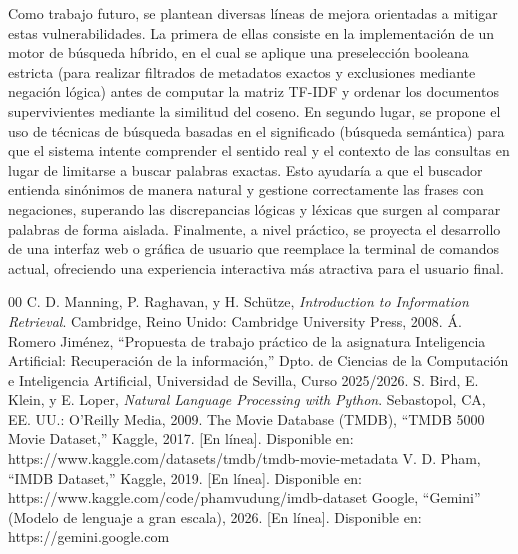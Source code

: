 \documentclass[conference,a4paper]{IEEEtran}
\begin{document}
Como trabajo futuro, se plantean diversas líneas de mejora orientadas a mitigar estas vulnerabilidades. La primera de ellas consiste en la implementación de un motor de búsqueda híbrido, en el cual se aplique una preselección booleana estricta (para realizar filtrados de metadatos exactos y exclusiones mediante negación lógica) antes de computar la matriz TF-IDF y ordenar los documentos supervivientes mediante la similitud del coseno. En segundo lugar, se propone el uso de técnicas de búsqueda basadas en el significado (búsqueda semántica) para que el sistema intente comprender el sentido real y el contexto de las consultas en lugar de limitarse a buscar palabras exactas. Esto ayudaría a que el buscador entienda sinónimos de manera natural y gestione correctamente las frases con negaciones, superando las discrepancias lógicas y léxicas que surgen al comparar palabras de forma aislada. Finalmente, a nivel práctico, se proyecta el desarrollo de una interfaz web o gráfica de usuario que reemplace la terminal de comandos actual, ofreciendo una experiencia interactiva más atractiva para el usuario final.



\begin{thebibliography}{00}
 C. D. Manning, P. Raghavan, y H. Schütze, \emph{Introduction to Information Retrieval}. Cambridge, Reino Unido: Cambridge University Press, 2008.
 Á. Romero Jiménez, ``Propuesta de trabajo práctico de la asignatura Inteligencia Artificial: Recuperación de la información,'' Dpto. de Ciencias de la Computación e Inteligencia Artificial, Universidad de Sevilla, Curso 2025/2026.
 S. Bird, E. Klein, y E. Loper, \emph{Natural Language Processing with Python}. Sebastopol, CA, EE. UU.: O'Reilly Media, 2009.
 The Movie Database (TMDB), ``TMDB 5000 Movie Dataset,'' Kaggle, 2017. [En línea]. Disponible en: https://www.kaggle.com/datasets/tmdb/tmdb-movie-metadata
 V. D. Pham, ``IMDB Dataset,'' Kaggle, 2019. [En línea]. Disponible en: https://www.kaggle.com/code/phamvudung/imdb-dataset
 Google, ``Gemini'' (Modelo de lenguaje a gran escala), 2026. [En línea]. Disponible en: https://gemini.google.com
\end{thebibliography}
\end{document}
